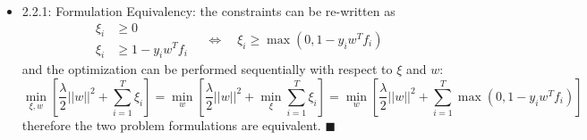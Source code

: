 \documentclass{article}
\newcommand{\qed}{\hfill$\blacksquare$}
\newcommand{\norm}[1]{\left\lvert\!\lvert{#1}\right\rvert\!\rvert}
\begin{document}
\begin{itemize}
	\item 2.2.1: Formulation Equivalency: the constraints can be re-written as
	\begin{equation}
		\begin{split}
			\xi_i&\ge0\\
			\xi_i&\ge1-y_iw^Tf_i
		\end{split}
		\quad\Leftrightarrow\quad
		\xi_i\ge\max\left(0,1-y_iw^Tf_i\right)
	\end{equation}
	and the optimization can be performed sequentially with respect to $\xi$ and $w$:
	\begin{equation}
		\min_{\xi,w}\left[\frac{\lambda}{2}\norm{w}^2+\sum_{i=1}^T\xi_i\right]
		=\min_{w}\left[\frac{\lambda}2\norm{w}^2+\min_{\xi}\sum_{i=1}^T\xi_i\right]
		=\min_{w}\left[\frac{\lambda}2\norm{w}^2+\sum_{i=1}^T\max(0,1-y_iw^Tf_i)\right]
	\end{equation}
	therefore the two problem formulations are equivalent. \qed
	

\end{itemize}
\end{document}
